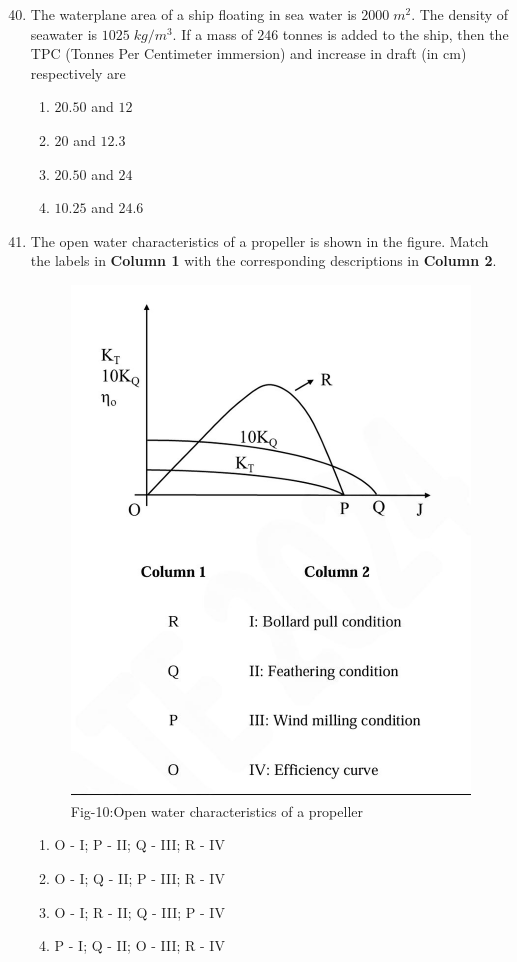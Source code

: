 \documentclass[journal]{IEEEtran}
\theoremstyle{remark}
\begin{document}
\begin{enumerate}[itemsep=1em]
\setcounter{enumi}{39}
\item The waterplane area of a ship floating in sea water is $2000\;m^2$. The density of seawater is $1025\;kg/m^3$. If a mass of $246$ tonnes is added to the ship, then the TPC 
(Tonnes Per Centimeter immersion) and increase in draft (in cm) respectively are 
\begin{multicols}{4}
\begin{enumerate}
       \item $20.50$ and $12$
       \item $20$ and $12.3$
       \item $20.50$ and $24$  
       \item $10.25$ and $24.6$ 
\end{enumerate}
\end{multicols}

\end{enumerate}

\newpage
\vspace*{0.25cm}

\begin{enumerate}[itemsep=1em]
\setcounter{enumi}{40}
\item The open water characteristics of a propeller is shown in the figure. Match the labels in \textbf{Column 1} with the corresponding descriptions in \textbf{Column 2}.
\begin{figure}[H]
    \centering
    \includegraphics[width=0.5\columnwidth]{figs/fig-10.jpeg}
    \caption*{Fig-10:Open water characteristics of a propeller}
    \label{fig-10}
\end{figure}
\begin{enumerate}[leftmargin=2.5em, labelsep=0.5em, itemsep=0.5em]
      \item O - I; P - II; Q - III; R - IV 
      \item O - I; Q - II; P - III; R - IV 
      \item O - I; R - II; Q - III; P - IV   
      \item P - I; Q - II; O - III; R - IV  
\end{enumerate}

\end{enumerate}
\end{document}

